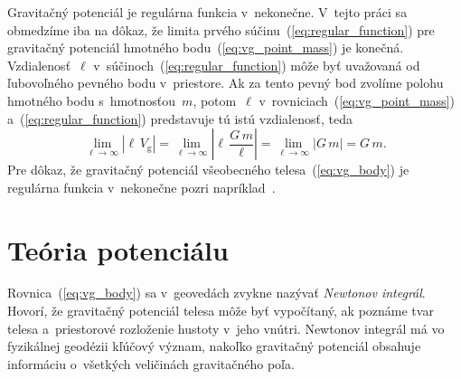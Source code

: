 \documentclass[a4paper, 12pt]{book}
\newcommand{\gidx}{\mathrm g}
\begin{document}
Gravitačný potenciál je regulárna funkcia v~nekonečne.  V~tejto práci sa 
obmedzíme iba na dôkaz, že limita prvého súčinu~(\ref{eq:regular_function}) pre 
gravitačný potenciál hmotného bodu~(\ref{eq:vg_point_mass}) je konečná.  
Vzdialenosť~$\ell$ v~súčinoch~(\ref{eq:regular_function}) môže byť uvažovaná od 
ľubovoľného pevného bodu v~priestore.  Ak za tento pevný bod zvolíme polohu 
hmotného bodu s~hmotnosťou~$m$, potom~$\ell$ 
v~rovniciach~(\ref{eq:vg_point_mass}) a~(\ref{eq:regular_function}) predstavuje 
tú istú vzdialenosť, teda
%
\begin{equation}
\label{eq:vg_regular}
\lim_{\ell \rightarrow \infty} \left| \ell \, V_\gidx \right| = \lim_{\ell 
\rightarrow \infty} \left| \ell \, \frac{G \, m}{\ell} \right| = \lim_{\ell 
\rightarrow \infty} \left| G \, m \right| = G \, m{.}
\end{equation}
%
Pre dôkaz, že gravitačný potenciál všeobecného telesa~(\ref{eq:vg_body}) je 
regulárna funkcia v~nekonečne pozri napríklad~\textcite{Pick1973}.






\section{Teória potenciálu}
\label{sec:potential_theory}

Rovnica~(\ref{eq:vg_body}) sa v~geovedách zvykne nazývať \emph{Newtonov
integrál}.  Hovorí, že gravitačný potenciál telesa môže byť vypočítaný, ak 
poznáme tvar telesa a~priestorové rozloženie hustoty v~jeho vnútri.  Newtonov
integrál má vo fyzikálnej geodézii kľúčový význam, nakoľko gravitačný potenciál 
obsahuje informáciu o~všetkých veličinách gravitačného poľa.
\end{document}
